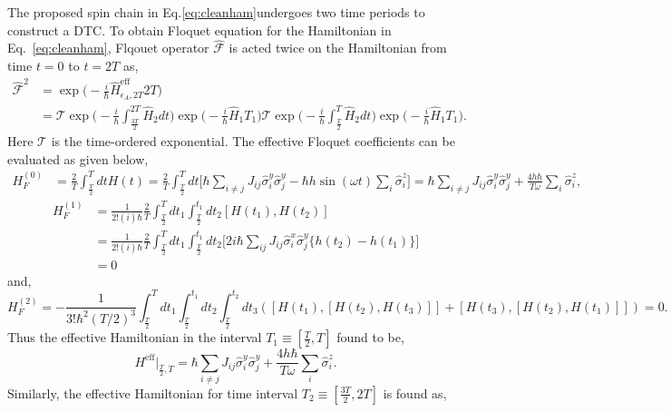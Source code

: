 \documentclass[%
reprint,
superscriptaddress,
amsmath,amssymb,showkeys,
aps,
prb,
]{revtex4-2}
\begin{document}
	The proposed spin chain in Eq.\eqref{eq:cleanham}undergoes two time periods to construct a DTC. To obtain Floquet equation for the Hamiltonian in Eq.~\ref{eq:cleanham}, Flqouet operator $\hat{\mathcal{F}}$ is acted twice on the Hamiltonian from time $t=0$ to $t=2T$ as,
	\begin{align*}
		\hat{\mathcal{F}}^2 &= \exp\Big(-\frac{i}{\hbar}\hat{H}_{\epsilon_A, 2T}^{\mathrm{eff}}2T\Big)\\ 
		&= \mathcal{T}\exp\Big(-\frac{i}{\hbar}\int_{\frac{3T}{2}}^{2T}\hat{H}_2 dt\Big)
		\exp\Big(-\frac{i}{\hbar}\hat{H}_1T_1\Big)\mathcal{T}\exp\Big(-\frac{i}{\hbar}\int_{\frac{T}{2}}^{T}\hat{H}_2 dt\Big)\exp\Big(-\frac{i}{\hbar}\hat{H}_1T_1\Big).
		\label{}
	\end{align*}
	Here $\mathcal{T}$ is the time-ordered exponential. The effective Floquet coefficients can be evaluated as given below,	
	\begin{align}
		H_F^{(0)} &= \frac{2}{T} \int_{\frac{T}{2}}^{T} dt H(t) = \frac{2}{T} \int_{\frac{T}{2}}^{T} dt \Bigg[\hbar\sum_{i\neq j} J_{ij} \hat{\sigma}^y_i \hat{\sigma}^y_j -\hbar h\sin(\omega t) \sum_i\hat{\sigma}^z_i\Bigg]= \hbar\sum_{i\neq j} J_{ij} \hat{\sigma}^y_i \hat{\sigma}^y_j + \frac{4h\hbar}{T \omega}\sum_i\hat{\sigma}^z_i,
	\end{align}	
	\begin{align}
		H_F^{(1)} &= \frac{1}{2!(i)\hbar} \frac{2}{T} \int_{\frac{T}{2}}^{T} dt_1  \int_{\frac{T}{2}}^{t_1} dt_2 [H(t_1), H(t_2)]\nonumber\\
		&= \frac{1}{2!(i)\hbar} \frac{2}{T}\int_{\frac{T}{2}}^{T} dt_1 \int_{\frac{T}{2}}^{t_1} dt_2\Bigg[2i\hbar\sum_{ij}^{}J_{ij}\hat{\sigma}^x_i\hat{\sigma}^y_j\Big\{h(t_2) -h(t_1)\Big\}\Bigg]\nonumber\\
		&= 0
	\end{align}	
	and,
	\begin{equation}
		H_F^{(2)} = -\frac{1}{3!\hbar^2 (T/2)^3} \int_{\frac{T}{2}}^{T} dt_1  \int_{{\frac{T}{2}}}^{t_1} dt_2 \int_{\frac{T}{2}}^{t_2} dt_3([H(t_1),[H(t_2), H(t_3)]] + [H(t_3),[H(t_2), H(t_1)]])= 0.    
	\end{equation}
	Thus the effective Hamiltonian in the interval $T_1\equiv[\frac{T}{2}, T]$ found to be,	
	\begin{equation}
		H^{\mathrm{eff}}\vert_{\frac{T}{2}, T} =  \hbar\sum_{i\neq j} J_{ij} \hat{\sigma}^y_i \hat{\sigma}^y_{j} + \frac{4h\hbar}{T \omega}\sum_i\hat{\sigma}^z_i.
	\end{equation} 	
	Similarly, the effective Hamiltonian for time interval $T_2\equiv[\frac{3T}{2}, 2T]$ is found as,	
\end{document}
